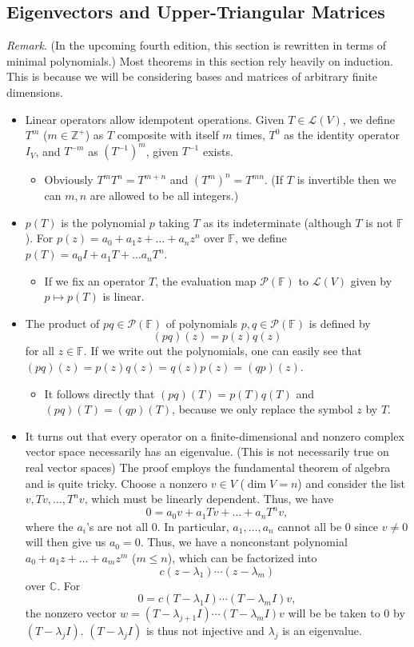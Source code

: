\documentclass{article}
\newcommand{\C}{\mathbb{C}}
\newcommand{\Z}{\mathbb{Z}}
\newcommand{\F}{\mathbb{F}}
\renewcommand{\d}{\dim}
\newcommand{\LV}{\mathcal{L}(V)}
\newcommand{\PF}{\mathcal{P}(\F)}
\begin{document}
\subsection{Eigenvectors and Upper-Triangular
Matrices}
\textit{Remark}. (In the upcoming fourth edition, this section is rewritten in terms of minimal polynomials.) Most theorems in this section rely heavily on induction. This is because we will be considering bases and matrices of arbitrary finite dimensions.
\begin{itemize}
    \item Linear operators allow idempotent operations. Given $T \in \LV$, we define $T^m$ ($m \in \Z^+$) as $T$ composite with itself $m$ times, $T^0$ as the identity operator $I_V$, and $T^{-m}$ as $(T^{-1})^m$, given $T^{-1}$ exists.
    \begin{itemize}
        \item Obviously $T^mT^n = T^{m+n}$ and $(T^m)^n = T^{mn}$. (If $T$ is invertible then we can $m,n$ are allowed to be all integers.)
    \end{itemize}
    \item $p(T)$ is the polynomial $p$ taking $T$ as its indeterminate (although $T$ is not $\F$). For $p(z) = a_0 + a_1 z + \dots + a_n z^n$ over $\F$, we define $p(T) = a_0 I + a_1 T + \dots a_n T^n$.
    \begin{itemize}
        \item If we fix an operator $T$, the evaluation map $\PF$ to $\LV$ given by $p \mapsto p(T)$ is linear.
    \end{itemize}
    \item The product of $pq \in \PF$ of polynomials $p,q \in \PF$ is defined by $$(pq)(z) = p(z)q(z)$$ for all $z \in \F$. If we write out the polynomials, one can easily see that $(pq)(z) = p(z)q(z) = q(z)p(z) = (qp)(z)$. 
    \begin{itemize}
        \item It follows directly that $(pq)(T) = p(T)q(T)$ and $(pq)(T) = (qp)(T)$, because we only replace the symbol $z$ by $T$.
    \end{itemize}
    \item It turns out that every operator on a finite-dimensional and nonzero complex vector space necessarily has an eigenvalue. (This is not necessarily true on real vector spaces) The proof employs the fundamental theorem of algebra and is quite tricky. Choose a nonzero $v \in V$ ($\d V=n$) and consider the list $v, Tv, \dots, T^n v$, which must be linearly dependent. Thus, we have $$0 = a_0 v + a_1 Tv + \dots + a_n T^n v,$$ where the $a_i$'s are not all $0$. In particular, $a_1, \dots, a_n$ cannot all be 0 since $v \not= 0$ will then give us $a_0 = 0$. Thus, we have a nonconstant polynomial $a_0+a_1 z+\dots+a_m z^m$ ($m \leq n$), which can be factorized into $$c(z - \lambda_1)\cdots(z - \lambda_m)$$ over $\C$. For $$0=c(T - \lambda_1 I)\cdots(T - \lambda_m I)v,$$ the nonzero vector $w = (T - \lambda_{j+1} I) \cdots (T - \lambda_m I)v$ will be be taken to 0 by $(T - \lambda_j I)$. $(T - \lambda_j I)$ is thus not injective and $\lambda_j$ is an eigenvalue.

\end{itemize}
\end{document}
